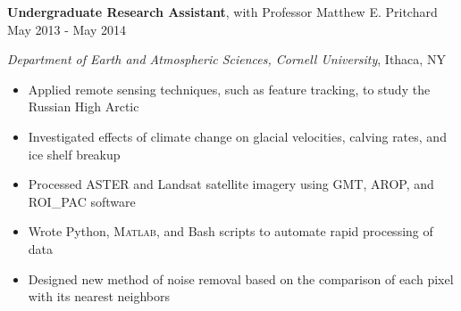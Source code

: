 
\textbf{Undergraduate Research Assistant}, with Professor Matthew E. Pritchard \hfill May 2013 - May 2014

\textit{Department of Earth and Atmospheric Sciences, Cornell University}, Ithaca, NY

\begin{itemize}
    \item Applied remote sensing techniques, such as feature tracking, to study the Russian High Arctic
    \item Investigated effects of climate change on glacial velocities, calving rates, and ice shelf breakup
    \item Processed ASTER and Landsat satellite imagery using GMT, AROP, and ROI\_PAC software
    \item Wrote Python, \textsc{Matlab}, and Bash scripts to automate rapid processing of data
    \item Designed new method of noise removal based on the comparison of each pixel with its nearest neighbors
\end{itemize}
